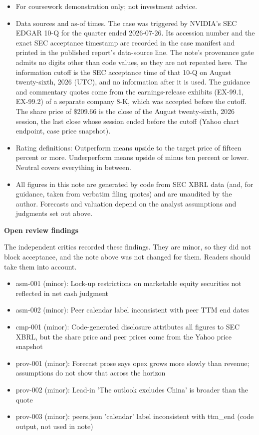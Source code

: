 \documentclass[a4paper,10pt]{article}
\begin{document}
\begin{itemize}\setlength{\itemsep}{1pt}
\item For coursework demonstration only; not investment advice.
\item Data sources and as-of times. The case was triggered by NVIDIA's SEC EDGAR 10-Q for the quarter ended 2026-07-26. Its accession number and the exact SEC acceptance timestamp are recorded in the case manifest and printed in the published report's data-source line. The note's provenance gate admits no digits other than code values, so they are not repeated here. The information cutoff is the SEC acceptance time of that 10-Q on August twenty-sixth, 2026 (UTC), and no information after it is used. The guidance and commentary quotes come from the earnings-release exhibits (EX-99.1, EX-99.2) of a separate company 8-K, which was accepted before the cutoff. The share price of \$209.66 is the close of the August twenty-sixth, 2026 session, the last close whose session ended before the cutoff (Yahoo chart endpoint, case price snapshot).
\item Rating definitions: Outperform means upside to the target price of fifteen percent or more. Underperform means upside of minus ten percent or lower. Neutral covers everything in between.
\item All figures in this note are generated by code from SEC XBRL data (and, for guidance, taken from verbatim filing quotes) and are unaudited by the author. Forecasts and valuation depend on the analyst assumptions and judgments set out above.
\end{itemize}

\par\smallskip\textbf{\color{MemoBlue}Open review findings}\par

The independent critics recorded these findings. They are minor, so they did not block acceptance, and the note above was not changed for them. Readers should take them into account.

\begin{itemize}\setlength{\itemsep}{1pt}
\item asm-001 (minor): Lock-up restrictions on marketable equity securities not reflected in net cash judgment
\item asm-002 (minor): Peer calendar label inconsistent with peer TTM end dates
\item cmp-001 (minor): Code-generated disclosure attributes all figures to SEC XBRL, but the share price and peer prices come from the Yahoo price snapshot
\item prov-001 (minor): Forecast prose says opex grows more slowly than revenue; assumptions do not show that across the horizon
\item prov-002 (minor): Lead-in 'The outlook excludes China' is broader than the quote
\item prov-003 (minor): peers.json 'calendar' label inconsistent with ttm\_end (code output, not used in note)
\end{itemize}
\end{document}
